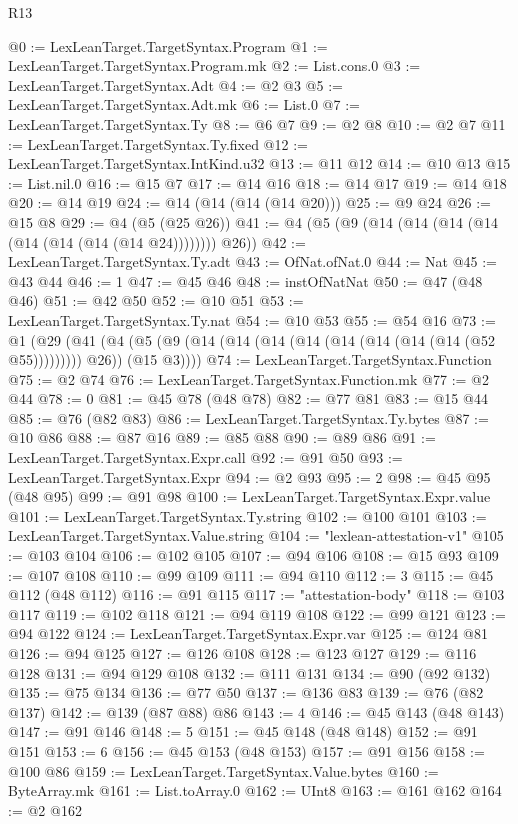 \begin{lexlean}{R13}
\begin{coremodule}
@0 := LexLeanTarget.TargetSyntax.Program
@1 := LexLeanTarget.TargetSyntax.Program.mk
@2 := List.cons.{0}
@3 := LexLeanTarget.TargetSyntax.Adt
@4 := @2 @3
@5 := LexLeanTarget.TargetSyntax.Adt.mk
@6 := List.{0}
@7 := LexLeanTarget.TargetSyntax.Ty
@8 := @6 @7
@9 := @2 @8
@10 := @2 @7
@11 := LexLeanTarget.TargetSyntax.Ty.fixed
@12 := LexLeanTarget.TargetSyntax.IntKind.u32
@13 := @11 @12
@14 := @10 @13
@15 := List.nil.{0}
@16 := @15 @7
@17 := @14 @16
@18 := @14 @17
@19 := @14 @18
@20 := @14 @19
@24 := @14 (@14 (@14 (@14 @20)))
@25 := @9 @24
@26 := @15 @8
@29 := @4 (@5 (@25 @26))
@41 := @4 (@5 (@9 (@14 (@14 (@14 (@14 (@14 (@14 (@14 (@14 @24)))))))) @26))
@42 := LexLeanTarget.TargetSyntax.Ty.adt
@43 := OfNat.ofNat.{0}
@44 := Nat
@45 := @43 @44
@46 := 1
@47 := @45 @46
@48 := instOfNatNat
@50 := @47 (@48 @46)
@51 := @42 @50
@52 := @10 @51
@53 := LexLeanTarget.TargetSyntax.Ty.nat
@54 := @10 @53
@55 := @54 @16
@73 := @1
    (@29
      (@41 (@4 (@5 (@9 (@14 (@14 (@14 (@14 (@14 (@14 (@14 (@14 (@52 @55))))))))) @26)) (@15 @3))))
@74 := LexLeanTarget.TargetSyntax.Function
@75 := @2 @74
@76 := LexLeanTarget.TargetSyntax.Function.mk
@77 := @2 @44
@78 := 0
@81 := @45 @78 (@48 @78)
@82 := @77 @81
@83 := @15 @44
@85 := @76 (@82 @83)
@86 := LexLeanTarget.TargetSyntax.Ty.bytes
@87 := @10 @86
@88 := @87 @16
@89 := @85 @88
@90 := @89 @86
@91 := LexLeanTarget.TargetSyntax.Expr.call
@92 := @91 @50
@93 := LexLeanTarget.TargetSyntax.Expr
@94 := @2 @93
@95 := 2
@98 := @45 @95 (@48 @95)
@99 := @91 @98
@100 := LexLeanTarget.TargetSyntax.Expr.value
@101 := LexLeanTarget.TargetSyntax.Ty.string
@102 := @100 @101
@103 := LexLeanTarget.TargetSyntax.Value.string
@104 := "lexlean-attestation-v1"
@105 := @103 @104
@106 := @102 @105
@107 := @94 @106
@108 := @15 @93
@109 := @107 @108
@110 := @99 @109
@111 := @94 @110
@112 := 3
@115 := @45 @112 (@48 @112)
@116 := @91 @115
@117 := "attestation-body"
@118 := @103 @117
@119 := @102 @118
@121 := @94 @119 @108
@122 := @99 @121
@123 := @94 @122
@124 := LexLeanTarget.TargetSyntax.Expr.var
@125 := @124 @81
@126 := @94 @125
@127 := @126 @108
@128 := @123 @127
@129 := @116 @128
@131 := @94 @129 @108
@132 := @111 @131
@134 := @90 (@92 @132)
@135 := @75 @134
@136 := @77 @50
@137 := @136 @83
@139 := @76 (@82 @137)
@142 := @139 (@87 @88) @86
@143 := 4
@146 := @45 @143 (@48 @143)
@147 := @91 @146
@148 := 5
@151 := @45 @148 (@48 @148)
@152 := @91 @151
@153 := 6
@156 := @45 @153 (@48 @153)
@157 := @91 @156
@158 := @100 @86
@159 := LexLeanTarget.TargetSyntax.Value.bytes
@160 := ByteArray.mk
@161 := List.toArray.{0}
@162 := UInt8
@163 := @161 @162
@164 := @2 @162

\end{coremodule}
\end{lexlean}
